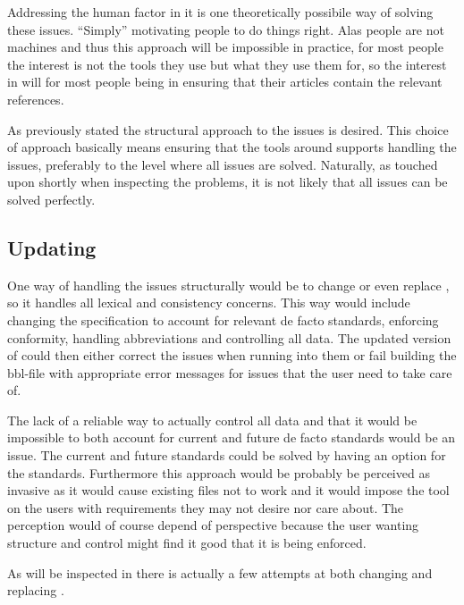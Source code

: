 
Addressing the human factor in it is one theoretically possibile way
of solving these issues.  ``Simply'' motivating people to do things
right.  Alas people are not machines and thus this approach will be
impossible in practice, for most people the interest is not the tools
they use but what they use them for, so the interest in {\bibtex} will
for most people being in ensuring that their articles contain the
relevant references.


As previously stated the structural approach to the issues is desired.
This choice of approach basically means ensuring that the tools around
{\bibtex} supports handling the issues, preferably to the level where
all issues are solved.  Naturally, as touched upon shortly when
inspecting the problems, it is not likely that all issues can be
solved perfectly.

\subsection{Updating {\bibtex}}

One way of handling the issues structurally would be to change or even
replace {\bibtex}, so it handles all lexical and consistency concerns.
This way would include changing the {\bibtex} specification to account
for relevant de facto standards, enforcing conformity, handling
abbreviations and controlling all data.  The updated version of
{\bibtex} could then either correct the issues when running into them
or fail building the bbl-file with appropriate error messages for
issues that the user need to take care of.



The lack of a reliable way to actually control all data and that it
would be impossible to both account for current and future de facto
standards would be an issue.  The current and future standards could
be solved by having an option for the standards.  Furthermore this
approach would be probably be perceived as invasive as it would cause
existing {\bibtex} files not to work and it would impose the tool on
the users with requirements they may not desire nor care about.  The
perception would of course depend of perspective because the user
wanting structure and control might find it good that it is being
enforced.

As will be inspected in  there is actually a few
attempts at both changing and replacing {\bibtex}.

